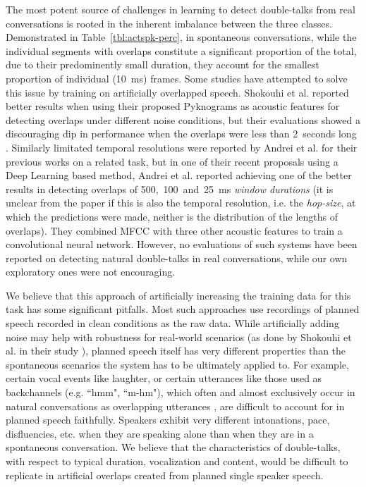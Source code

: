 \documentclass[a4paper]{article}
\begin{document}
The most potent source of challenges in learning to detect double-talks from real conversations
is rooted in the inherent imbalance between the three classes.
Demonstrated in Table~\ref{tbl:actspk-perc}, in spontaneous conversations,
while the individual segments with overlaps constitute a significant proportion of the total,
due to their predominently small duration,
they account for the smallest proportion of individual (10~ms) frames.
Some studies have attempted to solve this issue by training on artificially overlapped speech.
Shokouhi et al. reported better results when using their proposed Pyknograms as acoustic features for detecting overlaps under different noise conditions,
but their evaluations showed a discouraging dip in performance when the overlaps were less than 2~seconds long \cite{shokouhi_teager_2017}.
Similarly limitated temporal resolutions were reported by Andrei et al. for their previous works on a related task,
but in one of their recent proposals using a Deep Learning based method,
Andrei et al. reported achieving one of the better results in detecting overlaps of
500,~100~and~25~ms \textit{window durations} \cite{AndreiDetectingOverlappedSpeech2017}
(it is unclear from the paper if this is also the temporal resolution, i.e. the \textit{hop-size}, at which the predictions were made, neither is the distribution of the lengths of overlaps).
They combined MFCC with three other acoustic features to train a convolutional neural network.
However, no evaluations of such systems have been reported on detecting natural double-talks in real conversations,
while our own exploratory ones were not encouraging.

We believe that this approach of artificially increasing the training data for
this task has some significant pitfalls.
Most such approaches use recordings of planned speech recorded in clean conditions as the raw data.
While artificially adding noise may help with robustness for real-world scenarios
(as done by Shokouhi et al. in their study \cite{shokouhi_teager_2017}),
planned speech itself has very different properties than
the spontaneous scenarios the system has to be ultimately applied to.
For example, certain vocal events like laughter,
or certain utterances like those used as backchannels (e.g. “hmm", “m-hm"),
which often and almost exclusively occur in natural conversations as overlapping utterances \cite{GeigerUsinglinguisticinformation2013},
are difficult to account for in planned speech faithfully.
Speakers exhibit very different intonations, pace, disfluencies, etc. when
they are speaking alone than when they are in a spontaneous conversation.
We believe that the characteristics of double-talks,
with respect to typical duration, vocalization and content,
would be difficult to replicate in artificial overlaps created from planned single speaker speech.
\end{document}
